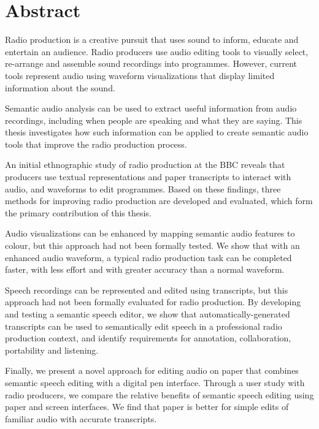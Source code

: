 \chapter*{Abstract}

Radio production is a creative pursuit that uses sound to inform, educate and entertain an audience. Radio producers
use audio editing tools to visually select, re-arrange and assemble sound recordings into programmes. However, current
tools represent audio using waveform visualizations that display limited information about the sound.

Semantic audio analysis can be used to extract useful information from audio recordings, including when people are
speaking and what they are saying. This thesis investigates how such information can be applied to create
semantic audio tools that improve the radio production process.

An initial ethnographic study of radio production at the BBC reveals that producers use textual representations and
paper transcripts to interact with audio, and waveforms to edit programmes. Based on these findings, three
methods for improving radio production are developed and evaluated, which form the primary contribution of this thesis.

Audio visualizations can be enhanced by mapping semantic audio features to colour, but this approach had not been
formally tested. We show that with an enhanced audio waveform, a typical radio production task can be completed faster,
with less effort and with greater accuracy than a normal waveform.

Speech recordings can be represented and edited using transcripts, but this approach had not been formally evaluated
for radio production. By developing and testing a semantic speech editor, we show that automatically-generated
transcripts can be used to semantically edit speech in a professional radio production context, and identify
requirements for annotation, collaboration, portability and listening.

Finally, we present a novel approach for editing audio on paper that combines semantic speech editing with a digital
pen interface. Through a user study with radio producers, we compare the relative benefits of semantic speech editing
using paper and screen interfaces. We find that paper is better for simple edits of familiar audio with accurate
transcripts.

